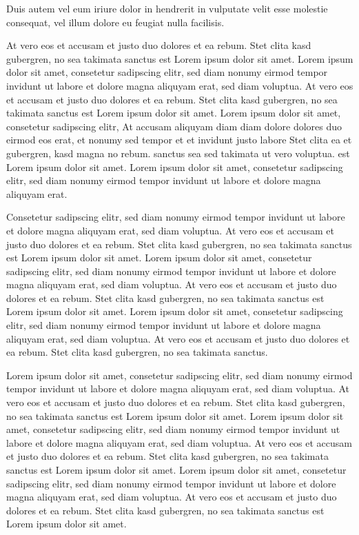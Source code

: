 \documentclass[]{../metanetpaper}
\begin{document}
Duis autem vel eum iriure dolor in hendrerit in vulputate velit esse molestie consequat, vel illum dolore eu feugiat nulla facilisis.   

At vero eos et accusam et justo duo dolores et ea rebum. Stet clita kasd gubergren, no sea takimata sanctus est Lorem ipsum dolor sit amet. Lorem ipsum dolor sit amet, consetetur sadipscing elitr, sed diam nonumy eirmod tempor invidunt ut labore et dolore magna aliquyam erat, sed diam voluptua. At vero eos et accusam et justo duo dolores et ea rebum. Stet clita kasd gubergren, no sea takimata sanctus est Lorem ipsum dolor sit amet. Lorem ipsum dolor sit amet, consetetur sadipscing elitr, At accusam aliquyam diam diam dolore dolores duo eirmod eos erat, et nonumy sed tempor et et invidunt justo labore Stet clita ea et gubergren, kasd magna no rebum. sanctus sea sed takimata ut vero voluptua. est Lorem ipsum dolor sit amet. Lorem ipsum dolor sit amet, consetetur sadipscing elitr, sed diam nonumy eirmod tempor invidunt ut labore et dolore magna aliquyam erat.   

Consetetur sadipscing elitr, sed diam nonumy eirmod tempor invidunt ut labore et dolore magna aliquyam erat, sed diam voluptua. At vero eos et accusam et justo duo dolores et ea rebum. Stet clita kasd gubergren, no sea takimata sanctus est Lorem ipsum dolor sit amet. Lorem ipsum dolor sit amet, consetetur sadipscing elitr, sed diam nonumy eirmod tempor invidunt ut labore et dolore magna aliquyam erat, sed diam voluptua. At vero eos et accusam et justo duo dolores et ea rebum. Stet clita kasd gubergren, no sea takimata sanctus est Lorem ipsum dolor sit amet. Lorem ipsum dolor sit amet, consetetur sadipscing elitr, sed diam nonumy eirmod tempor invidunt ut labore et dolore magna aliquyam erat, sed diam voluptua. At vero eos et accusam et justo duo dolores et ea rebum. Stet clita kasd gubergren, no sea takimata sanctus.   

Lorem ipsum dolor sit amet, consetetur sadipscing elitr, sed diam nonumy eirmod tempor invidunt ut labore et dolore magna aliquyam erat, sed diam voluptua. At vero eos et accusam et justo duo dolores et ea rebum. Stet clita kasd gubergren, no sea takimata sanctus est Lorem ipsum dolor sit amet. Lorem ipsum dolor sit amet, consetetur sadipscing elitr, sed diam nonumy eirmod tempor invidunt ut labore et dolore magna aliquyam erat, sed diam voluptua. At vero eos et accusam et justo duo dolores et ea rebum. Stet clita kasd gubergren, no sea takimata sanctus est Lorem ipsum dolor sit amet. Lorem ipsum dolor sit amet, consetetur sadipscing elitr, sed diam nonumy eirmod tempor invidunt ut labore et dolore magna aliquyam erat, sed diam voluptua. At vero eos et accusam et justo duo dolores et ea rebum. Stet clita kasd gubergren, no sea takimata sanctus est Lorem ipsum dolor sit amet.   
\end{document}
